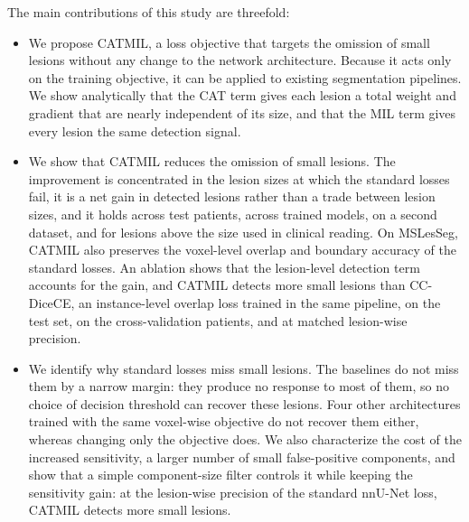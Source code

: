 The main contributions of this study are threefold:
\begin{itemize}
\item We propose CATMIL, a loss objective that targets the omission of
small lesions without any change to the network architecture. Because it
acts only on the training objective, it can be applied to existing
segmentation pipelines. We show analytically that the CAT term gives each
lesion a total weight and gradient that are nearly independent of its
size, and that the MIL term gives every lesion the same detection signal.
\item We show that CATMIL reduces the omission of small lesions. The
improvement is concentrated in the lesion sizes at which the standard
losses fail, it is a net gain in detected lesions rather than a trade
between lesion sizes, and it holds across test patients, across trained
models, on a second dataset, and for lesions above the size used in
clinical reading. On MSLesSeg, CATMIL also preserves the voxel-level
overlap and boundary accuracy of the standard losses. An ablation shows
that the lesion-level detection term accounts for the gain, and CATMIL
detects more small lesions than CC-DiceCE, an instance-level overlap loss
trained in the same pipeline, on the test set, on the cross-validation
patients, and at matched lesion-wise precision.
\item We identify why standard losses miss small lesions. The baselines do
not miss them by a narrow margin: they produce no response to most of
them, so no choice of decision threshold can recover these lesions. Four
other architectures trained with the same voxel-wise objective do not
recover them either, whereas changing only the objective does. We
also characterize the cost of the increased sensitivity, a larger number
of small false-positive components, and show that a simple
component-size filter controls it while keeping the sensitivity gain: at
the lesion-wise precision of the standard nnU-Net loss, CATMIL detects more
small lesions.
\end{itemize}
